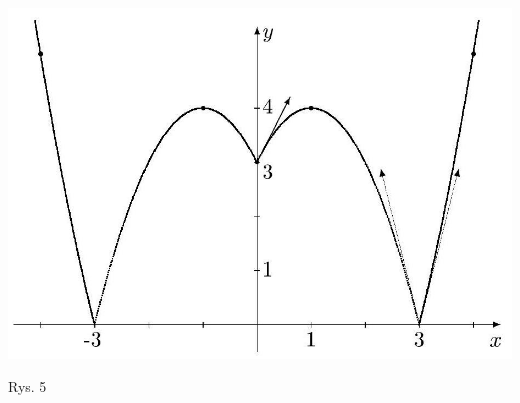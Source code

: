 \documentclass[10pt]{article}
\begin{document}
\includegraphics[max width=\textwidth, center]{2024_11_16_fe5b564401bf7db98894g-057}

Rys. 5
\end{document}
